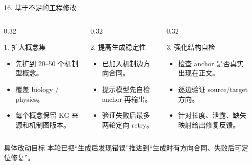 \documentclass[aspectratio=169,UTF8]{ctexbeamer}
\begin{document}
\begin{frame}{16. 基于不足的工程修改}
  \small
  \begin{columns}[T,onlytextwidth]
    \begin{column}{0.32\textwidth}
      \begin{block}{1. 扩大概念集}
        \begin{itemize}
          \item 先扩到 20--50 个机制型概念。
          \item 覆盖 biology / physics。
          \item 每个概念保留 KG 来源和机制图版本。
        \end{itemize}
      \end{block}
    \end{column}
    \begin{column}{0.32\textwidth}
      \begin{block}{2. 提高生成稳定性}
        \begin{itemize}
          \item 已加入机制边方向合同。
          \item 提示模型先自检 anchor 再输出。
          \item 验证失败后最多两轮定向 retry。
        \end{itemize}
      \end{block}
    \end{column}
    \begin{column}{0.32\textwidth}
      \begin{block}{3. 强化结构自检}
        \begin{itemize}
          \item 检查 anchor 是否真实出现在正文。
          \item 逐边验证 source/target 方向。
          \item 针对长度、泄露、缺失映射给出修复反馈。
        \end{itemize}
      \end{block}
    \end{column}
  \end{columns}

  \vspace{0.4em}
  \begin{block}{具体改动目标}
    本轮已把“生成后发现错误”推进到“生成时有方向合同、失败后可定位修复”。
  \end{block}
\end{frame}
\end{document}
